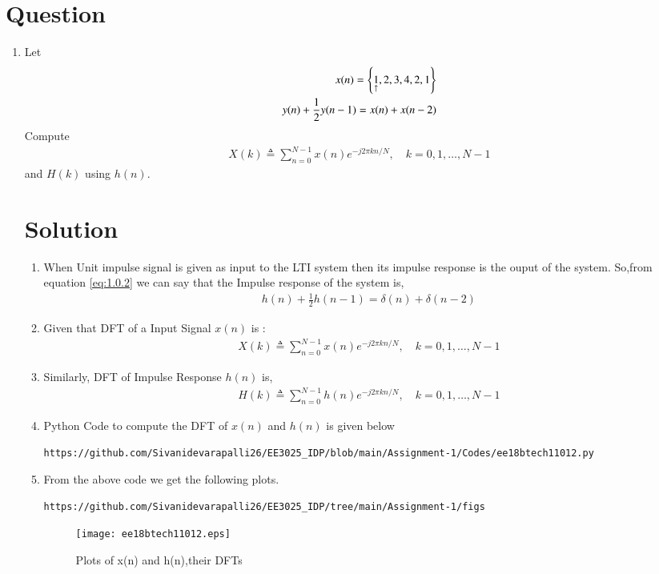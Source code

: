 \documentclass[journal,12pt,twocolumn]{IEEEtran}
\renewcommand\thesection{\arabic{section}}
\begin{document}
\section{Question}
\begin{enumerate}[label=\thesection.\arabic*.,ref=\thesection.\theenumi]
    
\item Let
\begin{align}
    x(n) = \left\{\underset{\uparrow}{1},2,3,4,2,1\right\} \\
    y(n) + \frac{1}{2}y(n-1) = x(n) + x(n-2) \label{eq:1.0.2}
\end{align}
Compute
\begin{align}
    X(k) \triangleq \sum_{n=0}^{N-1}x(n)e^{-j2\pi kn/N},\quad k=0,1, \ldots, N-1
\end{align}
and $H(k)$ using $h(n)$.
\section{Solution}
\begin{enumerate}[label=\thesection.\arabic*.,ref=\thesection.\theenumi]
\item
When Unit impulse signal is given as input to the LTI system then its impulse response is the ouput of the system.
So,from equation \eqref{eq:1.0.2} we can say that the Impulse response of the system is,
\begin{align}
    h(n) + \frac{1}{2}h(n-1) = \delta(n) + \delta(n-2)	
\end{align}

\item Given that DFT of a Input Signal $x(n)$ is :
\begin{align}
    X(k) \triangleq \sum_{n=0}^{N-1}x(n)e^{-j2\pi kn/N},\quad k=0,1, \ldots, N-1 \label{eq:2.0.2}
\end{align}
\item Similarly, DFT of Impulse Response $h(n)$ is,
\begin{align}
    H(k) \triangleq \sum_{n=0}^{N-1}h(n)e^{-j2\pi kn/N},\quad k=0,1, \ldots, N-1 \label{eq:2.0.3}
\end{align}
\item Python Code to compute the DFT of $x(n)$ and $h(n)$ is given below
\begin{lstlisting}
https://github.com/Sivanidevarapalli26/EE3025_IDP/blob/main/Assignment-1/Codes/ee18btech11012.py
\end{lstlisting}
\item From the above code we get the following plots.
\begin{lstlisting}
https://github.com/Sivanidevarapalli26/EE3025_IDP/tree/main/Assignment-1/figs
\end{lstlisting}
\begin{figure}[h!]
    \centering
    \texttt{[image: ee18btech11012.eps]}
    \caption{Plots of x(n) and h(n),their DFTs}
    \label{figs}
\end{figure}



\end{enumerate}
\end{enumerate}
\end{document}
